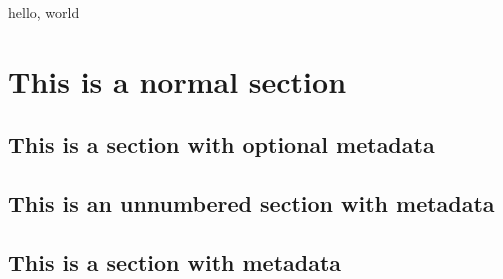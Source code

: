 \documentclass{amsart}
\begin{document}
hello, world

\section{This is a normal section}

\begin{sectionWithMetadata}
\section{This is a section with optional metadata}
\end{sectionWithMetadata}

\begin{sectionWithMetadata}
\section*{This is an unnumbered section with metadata}
\end{sectionWithMetadata}

\begin{sectionWithMetadata}
\section{This is a section with metadata}
\author{David M. Jones}
\end{sectionWithMetadata}
\end{document}
